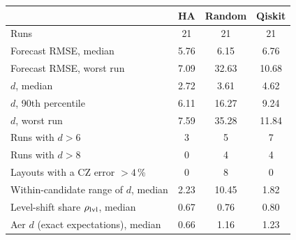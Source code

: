 \begin{tabular}{@{}lccc@{}}
\toprule
 & HA & Random & Qiskit \\
\midrule
Runs & 21 & 21 & 21 \\
Forecast RMSE, median & 5.76 & 6.15 & 6.76 \\
Forecast RMSE, worst run & 7.09 & 32.63 & 10.68 \\
$d$, median & 2.72 & 3.61 & 4.62 \\
$d$, 90th percentile & 6.11 & 16.27 & 9.24 \\
$d$, worst run & 7.59 & 35.28 & 11.84 \\
Runs with $d>6$ & 3 & 5 & 7 \\
Runs with $d>8$ & 0 & 4 & 4 \\
Layouts with a CZ error $>4$\,\% & 0 & 8 & 0 \\
Within-candidate range of $d$, median & 2.23 & 10.45 & 1.82 \\
Level-shift share $\rho_{\rm lvl}$, median & 0.67 & 0.76 & 0.80 \\
Aer $d$ (exact expectations), median & 0.66 & 1.16 & 1.23 \\
\bottomrule
\end{tabular}
